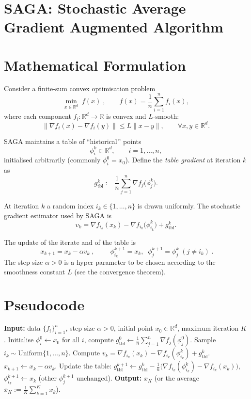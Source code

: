 \documentclass[11pt]{article}
\newcommand{\R}{\mathbb{R}}
\begin{document}
\section*{SAGA: Stochastic Average Gradient Augmented Algorithm}

\section*{Mathematical Formulation}
Consider a finite-sum convex optimisation problem
\[
\min_{x\in\R^{d}} \; f(x)\;,\qquad 
f(x)=\frac{1}{n}\sum_{i=1}^{n} f_i(x),
\]
where each component $f_i:\R^{d}\rightarrow\R$ is convex and $L$‑smooth:
\[
\|\nabla f_i(x)-\nabla f_i(y)\|\le L\|x-y\|,\qquad\forall x,y\in\R^{d}. \tag{A1}
\]

SAGA maintains a table of “historical’’ points
\[
\phi_i^{k}\in\R^{d},\qquad i=1,\dots,n,
\]
initialised arbitrarily (commonly $\phi_i^{0}=x_{0}$).  
Define the \emph{table gradient} at iteration $k$ as
\[
g^{k}_{\text{tbl}}:=\frac{1}{n}\sum_{j=1}^{n}\nabla f_{j}\!\bigl(\phi^{k}_{j}\bigr). \tag{1}
\]

At iteration $k$ a random index $i_{k}\in\{1,\dots,n\}$ is drawn uniformly.
The stochastic gradient estimator used by SAGA is
\[
v_{k}= \nabla f_{i_{k}}(x_{k})-\nabla f_{i_{k}}\!\bigl(\phi^{k}_{i_{k}}\bigr)+g^{k}_{\text{tbl}}. \tag{2}
\]

The update of the iterate and of the table is
\[
\boxed{\;x_{k+1}=x_{k}-\alpha v_{k}\;}, \qquad
\boxed{\;\phi^{k+1}_{i_{k}}=x_{k},\;\; \phi^{k+1}_{j}= \phi^{k}_{j}\;(j\neq i_{k})\;}. \tag{3}
\]
The step size $\alpha>0$ is a hyper‑parameter to be chosen according to the
smoothness constant $L$ (see the convergence theorem).

\section*{Pseudocode}
\begin{algorithm}[H]
\caption{SAGA for Finite‑Sum Minimisation}
\begin{algorithmic}[1]
\State \textbf{Input:} data $\{f_i\}_{i=1}^{n}$, step size $\alpha>0$, 
initial point $x_{0}\in\R^{d}$, maximum iteration $K$.
\State Initialise $\phi^{0}_{i}\gets x_{0}$ for all $i$, compute $g^{0}_{\text{tbl}} \gets 
\frac1n\sum_{j=1}^{n}\nabla f_{j}(\phi^{0}_{j})$.
    \State Sample $i_{k}\sim\text{Uniform}\{1,\dots,n\}$.
    \State Compute $v_{k}= \nabla f_{i_{k}}(x_{k})-\nabla f_{i_{k}}(\phi^{k}_{i_{k}})+g^{k}_{\text{tbl}}$.
    \State $x_{k+1}\gets x_{k}-\alpha v_{k}$.
    \State Update the table:
          \State\quad $g^{k+1}_{\text{tbl}}\gets g^{k}_{\text{tbl}}
          -\frac{1}{n}\bigl(\nabla f_{i_{k}}(\phi^{k}_{i_{k}})-\nabla f_{i_{k}}(x_{k})\bigr)$,
          \State\quad $\phi^{k+1}_{i_{k}}\gets x_{k}$ (other $\phi^{k+1}_{j}$ unchanged).
\EndFor
\State \textbf{Output:} $x_{K}$ (or the average $\bar x_{K}:=\frac1K\sum_{k=1}^{K}x_{k}$).
\end{algorithmic}
\end{algorithm}
\end{document}
